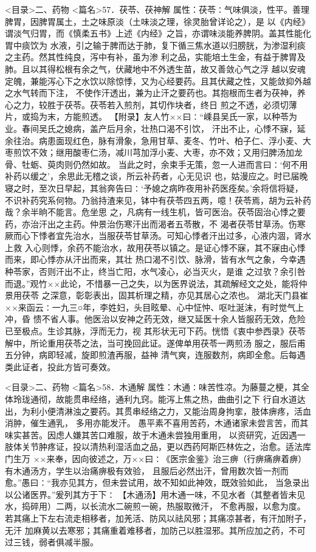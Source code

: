\documentclass[a4paper,12pt,UTF8,twoside]{ctexbook}
\begin{document}
<目录>二、药物
<篇名>57．茯苓、茯神解
属性：茯苓∶气味俱淡，性平。善理脾胃，因脾胃属土，土之味原淡（土味淡之理，徐灵胎曾详论之），是 
以《内经》谓淡气归胃，而《慎柔五书》上述《内经》之旨，亦谓味淡能养脾阴。盖其性能化胃中痰饮为 
水液，引之输于脾而达于肺，复下循三焦水道以归膀胱，为渗湿利痰之主药。然其性纯良，泻中有补，虽为渗 
利之品，实能培土生金，有益于脾胃及肺。且以其得松根有余之气，伏藏地中不外透生苗，故又善敛心气之浮 
越以安魂定魄，兼能泻心下之水饮以除惊悸，又为心经要药。且其伏藏之性，又能敛抑外越之水气转而下注， 
不使作汗透出，兼为止汗之要药也。其抱根而生者为茯神，养心之力，较胜于茯苓。茯苓若入煎剂，其切作块者，终日 
煎之不透，必须切薄片，或捣为末，方能煎透。 
【附录】友人竹××曰∶“嵊县吴氏一家，以种苓为业。春间吴氏之媳病，盖产后月余，壮热口渴不引饮， 
汗出不止，心悸不寐，延余往治。病患面现红色，脉有滑象，急用甘草、麦冬、竹叶、柏子仁、浮小麦、大 
枣煎饮不效；继用酸枣仁汤，减川芎加浮小麦、大枣，亦不效；又用归脾汤加龙骨、牡蛎、萸肉则仍然如故。 
当此之时，余束手无策，忽一人进而言曰∶‘何不用补药以缓之’，余思此无稽之谈，所云补药者，心无见识 
也，姑漫应之。时已届晚寝之时，至次日早起，其翁奔告曰∶‘予媳之病昨夜用补药医痊矣。’余将信将疑， 
不识补药究系何物。乃翁持渣来见，钵中有茯苓四五两，噫！茯苓焉，胡为云补药哉？余半晌不能言。危坐思 
之，凡病有一线生机，皆可医治。茯苓固治心悸之要药，亦治汗出之主药。仲景治伤寒汗出而渴者五苓散，不 
渴者茯苓甘草汤。伤寒厥而心下悸者宜先治水，当服茯苓甘草汤。可知心悸者汗出过多，心液内涸，肾水上救 
入心则悸，余药不能治水，故用茯苓以镇之。是证心悸不寐，其不寐由心悸而来，即心悸亦从汗出而来，其壮 
热口渴不引饮、脉滑，皆有水气之象，今幸遇种苓家，否则汗出不止，终当亡阳，水气凌心，必当灭火，是谁 
之过欤？余引咎而退。”观竹××此论，不惜暴一己之失，以为医界说法，其疏解经文之处，能将仲景用茯苓 
之深意，彰彰表出，固其析理之精，亦见其居心之浓也。 
湖北天门县崔××来函云∶一九三○年，李姓妇，头目眩晕、心中怔忡、呕吐涎沫，有时觉气上冲，昏 
愦不省人事。他医治以安神之药无效，继又延医十余人皆服药无效，危险已至极点。生诊其脉，浮而无力，视 
其形状无可下药。恍悟《衷中参西录》茯苓解中，所论重用茯苓之法，当可挽回此证。遂俾单用茯苓一两煎汤 
服之，服后甫五分钟，病即轻减，旋即煎渣再服，益神 
清气爽，连服数剂，病即全愈。后每遇类此证者，投此方皆可奏效。 

<目录>二、药物
<篇名>58．木通解
属性：木通∶味苦性凉。为藤蔓之梗，其全体玲珑通彻，故能贯串经络，通利九窍。能泻上焦之热，曲曲引之下 
行自水道达出，为利小便清淋浊之要药。其贯串经络之力，又能治周身拘挛，肢体痹疼，活血消肿，催生通乳， 
多用亦能发汗。 
愚平素不喜用苦药，木通诸家未尝言苦，而其味实甚苦。因虑人嫌其苦口难服，故于木通未尝独用重用， 
以资研究，近因遇一肢体关节肿疼证，投以清热利湿活血之品，更以西药阿斯匹林佐之，治愈。适法库门生万 
××来奉，因向彼述之，万××曰∶《医宗金鉴》治三痹（行痹痛痹着痹）有木通汤方，学生以治痛痹极有效验， 
且服后必然出汗，曾用数次皆一剂而愈。”愚曰∶“我亦见其方，但未尝试用，故不知如此神效，既效验如此， 
当急录出以公诸医界。”爰列其方于下∶ 
【木通汤】用木通一味，不见水者（其整者皆未见水，捣碎用）二两，以长流水二碗煎一碗，热服取微汗， 
不愈再服，以愈为度。若其痛上下左右流走相移者，加羌活、防风以祛风邪；其痛凉甚者，有汗加附子，无汗 
加麻黄以去寒邪；其痛重着难移者，加防己以胜湿邪。其所应加之药，不可过三钱，弱者俱减半服。 
\end{document}

